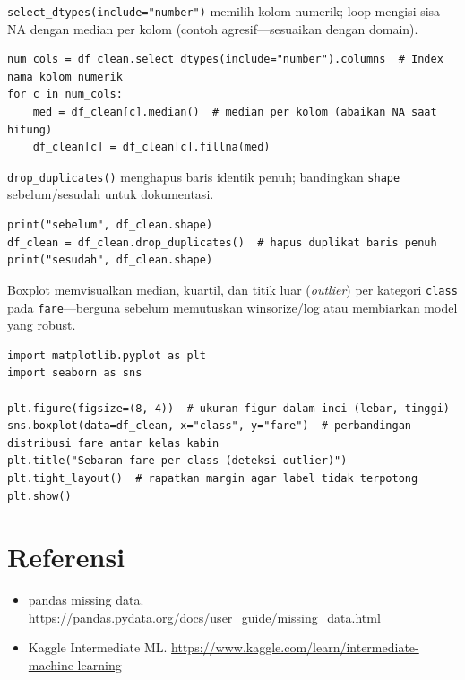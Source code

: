 \documentclass[../main.tex]{subfiles}
\begin{document}
\MulaiPenjelasanKode \texttt{select\_dtypes(include="number")} memilih kolom numerik; loop mengisi sisa NA dengan median per kolom (contoh agresif---sesuaikan dengan domain). \SelesaiPenjelasanKode

\begin{lstlisting}[caption=Imputasi median untuk kolom numerik lain (opsional)]
num_cols = df_clean.select_dtypes(include="number").columns  # Index nama kolom numerik
for c in num_cols:
    med = df_clean[c].median()  # median per kolom (abaikan NA saat hitung)
    df_clean[c] = df_clean[c].fillna(med)
\end{lstlisting}

\MulaiPenjelasanKode \texttt{drop\_duplicates()} menghapus baris identik penuh; bandingkan \texttt{shape} sebelum/sesudah untuk dokumentasi. \SelesaiPenjelasanKode

\begin{lstlisting}[caption=Duplikat dan shape]
print("sebelum", df_clean.shape)
df_clean = df_clean.drop_duplicates()  # hapus duplikat baris penuh
print("sesudah", df_clean.shape)
\end{lstlisting}

\MulaiPenjelasanKode Boxplot memvisualkan median, kuartil, dan titik luar (\textit{outlier}) per kategori \texttt{class} pada \texttt{fare}---berguna sebelum memutuskan winsorize/log atau membiarkan model yang robust. \SelesaiPenjelasanKode

\begin{lstlisting}[caption=Boxplot tarif per kelas (outlier visual)]
import matplotlib.pyplot as plt
import seaborn as sns

plt.figure(figsize=(8, 4))  # ukuran figur dalam inci (lebar, tinggi)
sns.boxplot(data=df_clean, x="class", y="fare")  # perbandingan distribusi fare antar kelas kabin
plt.title("Sebaran fare per class (deteksi outlier)")
plt.tight_layout()  # rapatkan margin agar label tidak terpotong
plt.show()
\end{lstlisting}

\section{Referensi}

\begin{itemize}[leftmargin=*]
  \item pandas missing data. \url{https://pandas.pydata.org/docs/user_guide/missing_data.html}
  \item Kaggle Intermediate ML. \url{https://www.kaggle.com/learn/intermediate-machine-learning}
\end{itemize}
\end{document}
